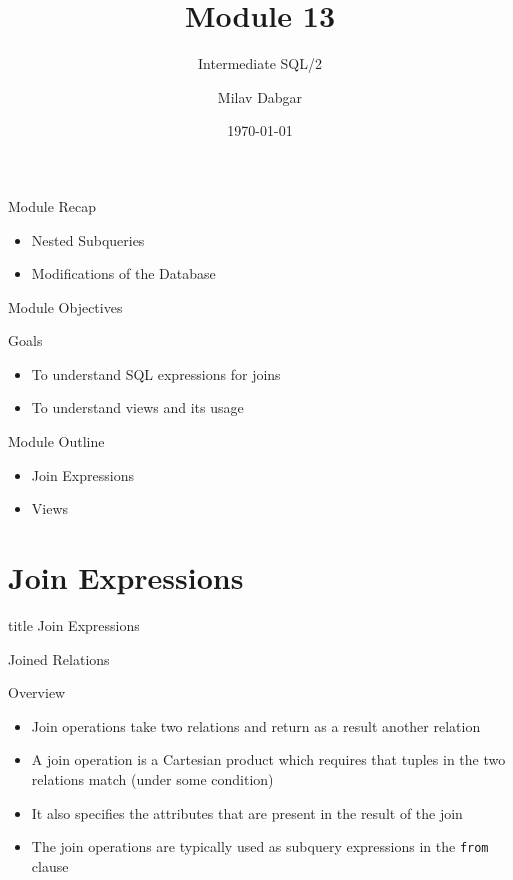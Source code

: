 \documentclass[aspectratio=169, xcolor=dvipsnames]{beamer}
\title{Module 13}
\subtitle{Intermediate SQL/2}
\author{Milav Dabgar}
\institute{www.milav.in}
\date{\today}
\begin{document}
\begin{frame}
    \titlepage
\end{frame}

\begin{frame}{Module Recap}
    \begin{itemize}[<+->]
        \item Nested Subqueries
        \item Modifications of the Database
    \end{itemize}
\end{frame}

\begin{frame}{Module Objectives}
    \begin{block}{Goals}
        \begin{itemize}[<+->]
            \item To understand SQL expressions for joins
            \item To understand views and its usage
        \end{itemize}
    \end{block}
\end{frame}

\begin{frame}{Module Outline}
    \begin{itemize}[<+->]
        \item Join Expressions
        \item Views
    \end{itemize}
\end{frame}

\section{Join Expressions}
\begin{frame}
  \vfill
  \centering
  \begin{beamercolorbox}[sep=8pt,center,shadow=true,rounded=true]{title}
    Join Expressions\par%
  \end{beamercolorbox}
  \vfill
\end{frame}

\begin{frame}{Joined Relations}
    \begin{block}{Overview}
        \begin{itemize}[<+->]
            \item Join operations take two relations and return as a result another relation
            \item A join operation is a Cartesian product which requires that tuples in the two relations match (under some condition)
            \item It also specifies the attributes that are present in the result of the join
            \item The join operations are typically used as subquery expressions in the \texttt{from} clause
        \end{itemize}
    \end{block}
\end{frame}
\end{document}
